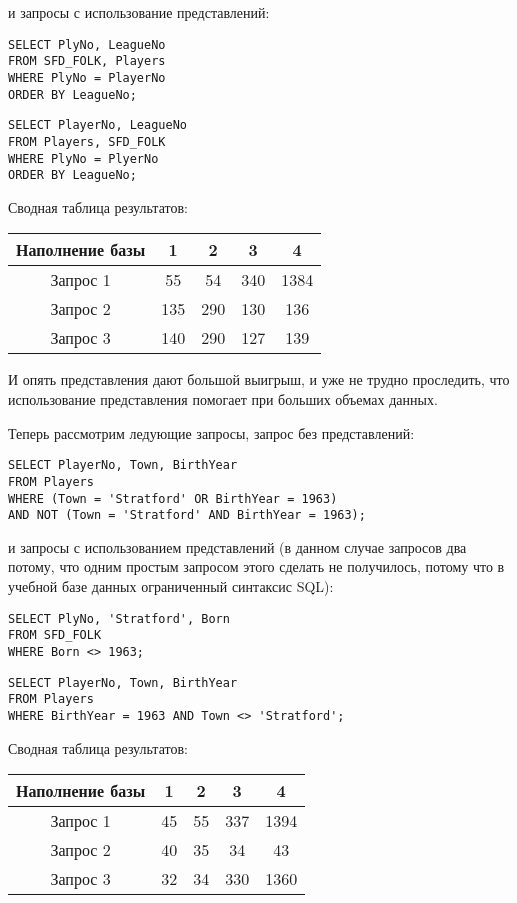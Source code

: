 \documentclass[a4paper,12pt]{article}
\begin{document}
и запросы с использование представлений:

\begin{lstlisting}
SELECT PlyNo, LeagueNo
FROM SFD_FOLK, Players
WHERE PlyNo = PlayerNo
ORDER BY LeagueNo;
\end{lstlisting}

\begin{lstlisting}
SELECT PlayerNo, LeagueNo
FROM Players, SFD_FOLK
WHERE PlyNo = PlyerNo
ORDER BY LeagueNo;
\end{lstlisting}

Сводная таблица результатов:

\begin{tabular}[t]{|c|c|c|c|c|}
\hline
Наполнение базы  &    1 &    2 &    3 &    4 \\
\hline
Запрос 1         &   55 &   54 &  340 & 1384 \\
\hline
Запрос 2         &  135 &  290 &  130 &  136 \\
\hline
Запрос 3         &  140 &  290 &  127 &  139 \\
\hline
\end{tabular}

И опять представления дают большой выигрыш, и уже не трудно проследить, что использование представления помогает при больших объемах данных.

Теперь рассмотрим ледующие запросы, запрос без представлений:

\begin{lstlisting}
SELECT PlayerNo, Town, BirthYear
FROM Players
WHERE (Town = 'Stratford' OR BirthYear = 1963)
AND NOT (Town = 'Stratford' AND BirthYear = 1963);
\end{lstlisting}

и запросы с использованием представлений (в данном случае запросов два потому, что одним простым запросом этого сделать не получилось, потому что в учебной базе данных ограниченный синтаксис SQL):

\begin{lstlisting}
SELECT PlyNo, 'Stratford', Born
FROM SFD_FOLK
WHERE Born <> 1963;
\end{lstlisting}

\begin{lstlisting}
SELECT PlayerNo, Town, BirthYear
FROM Players
WHERE BirthYear = 1963 AND Town <> 'Stratford';
\end{lstlisting}

Сводная таблица результатов:

\begin{tabular}[t]{|c|c|c|c|c|}
\hline
Наполнение базы &    1 &    2 &    3 &    4 \\
\hline
Запрос 1        &   45 &   55 &  337 & 1394 \\
\hline
Запрос 2        &   40 &   35 &   34 &   43 \\
\hline
Запрос 3        &   32 &   34 &  330 & 1360 \\
\hline
\end{tabular}
\end{document}

